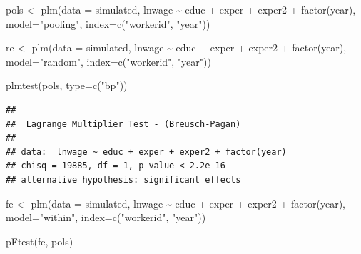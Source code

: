 \documentclass[
]{article}
\newenvironment{Shaded}{\begin{snugshade}}{\end{snugshade}}
\newcommand{\AttributeTok}[1]{\textcolor[rgb]{0.77,0.63,0.00}{#1}}
\newcommand{\FunctionTok}[1]{\textcolor[rgb]{0.00,0.00,0.00}{#1}}
\newcommand{\NormalTok}[1]{#1}
\newcommand{\OtherTok}[1]{\textcolor[rgb]{0.56,0.35,0.01}{#1}}
\newcommand{\SpecialCharTok}[1]{\textcolor[rgb]{0.00,0.00,0.00}{#1}}
\newcommand{\StringTok}[1]{\textcolor[rgb]{0.31,0.60,0.02}{#1}}
\begin{document}
\begin{Shaded}
\begin{Highlighting}[]
\NormalTok{  pols }\OtherTok{\textless{}{-}} \FunctionTok{plm}\NormalTok{(}\AttributeTok{data =}\NormalTok{ simulated, lnwage }\SpecialCharTok{\textasciitilde{}}\NormalTok{ educ }\SpecialCharTok{+}\NormalTok{ exper }\SpecialCharTok{+} 
\NormalTok{              exper2 }\SpecialCharTok{+} \FunctionTok{factor}\NormalTok{(year), }
            \AttributeTok{model=}\StringTok{"pooling"}\NormalTok{, }\AttributeTok{index=}\FunctionTok{c}\NormalTok{(}\StringTok{"workerid"}\NormalTok{, }\StringTok{"year"}\NormalTok{))}

\NormalTok{  re }\OtherTok{\textless{}{-}} \FunctionTok{plm}\NormalTok{(}\AttributeTok{data =}\NormalTok{ simulated, lnwage }\SpecialCharTok{\textasciitilde{}}\NormalTok{ educ }\SpecialCharTok{+}\NormalTok{ exper }\SpecialCharTok{+} 
\NormalTok{            exper2 }\SpecialCharTok{+} \FunctionTok{factor}\NormalTok{(year), }
          \AttributeTok{model=}\StringTok{"random"}\NormalTok{, }\AttributeTok{index=}\FunctionTok{c}\NormalTok{(}\StringTok{"workerid"}\NormalTok{, }\StringTok{"year"}\NormalTok{))}

  \FunctionTok{plmtest}\NormalTok{(pols, }\AttributeTok{type=}\FunctionTok{c}\NormalTok{(}\StringTok{"bp"}\NormalTok{))}
\end{Highlighting}
\end{Shaded}

\begin{verbatim}
## 
##  Lagrange Multiplier Test - (Breusch-Pagan)
## 
## data:  lnwage ~ educ + exper + exper2 + factor(year)
## chisq = 19885, df = 1, p-value < 2.2e-16
## alternative hypothesis: significant effects
\end{verbatim}

\begin{Shaded}
\begin{Highlighting}[]
\NormalTok{  fe }\OtherTok{\textless{}{-}} \FunctionTok{plm}\NormalTok{(}\AttributeTok{data =}\NormalTok{ simulated, lnwage }\SpecialCharTok{\textasciitilde{}}\NormalTok{ educ }\SpecialCharTok{+}\NormalTok{ exper }\SpecialCharTok{+} 
\NormalTok{              exper2 }\SpecialCharTok{+} \FunctionTok{factor}\NormalTok{(year), }
            \AttributeTok{model=}\StringTok{"within"}\NormalTok{, }\AttributeTok{index=}\FunctionTok{c}\NormalTok{(}\StringTok{"workerid"}\NormalTok{, }\StringTok{"year"}\NormalTok{))}
  
  \FunctionTok{pFtest}\NormalTok{(fe, pols)}
\end{Highlighting}
\end{Shaded}
\end{document}
